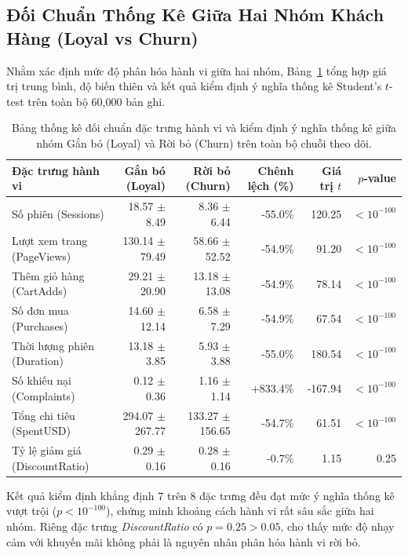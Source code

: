 \documentclass[12pt,a4paper]{report}
\begin{document}
\subsection{Đối Chuẩn Thống Kê Giữa Hai Nhóm Khách Hàng (Loyal vs Churn)}
Nhằm xác định mức độ phân hóa hành vi giữa hai nhóm, Bảng~\ref{tab:cust_stats} tổng hợp giá trị trung bình, độ biến thiên và kết quả kiểm định ý nghĩa thống kê Student's $t$-test trên toàn bộ 60,000 bản ghi.

\begin{table}[H]
\centering
\small
\caption{Bảng thống kê đối chuẩn đặc trưng hành vi và kiểm định ý nghĩa thống kê giữa nhóm Gắn bó (Loyal) và Rời bỏ (Churn) trên toàn bộ chuỗi theo dõi.}
\label{tab:cust_stats}
\begin{tabularx}{\textwidth}{lrrrrr}
\toprule
\textbf{Đặc trưng hành vi} & \textbf{Gắn bó (Loyal)} & \textbf{Rời bỏ (Churn)} & \textbf{Chênh lệch (\%)} & \textbf{Giá trị $t$} & \textbf{$p$-value} \\
\midrule
Số phiên (Sessions) & 18.57 $\pm$ 8.49 & 8.36 $\pm$ 6.44 & -55.0\% & 120.25 & $< 10^{-100}$ \\
Lượt xem trang (PageViews) & 130.14 $\pm$ 79.49 & 58.66 $\pm$ 52.52 & -54.9\% & 91.20 & $< 10^{-100}$ \\
Thêm giỏ hàng (CartAdds) & 29.21 $\pm$ 20.90 & 13.18 $\pm$ 13.08 & -54.9\% & 78.14 & $< 10^{-100}$ \\
Số đơn mua (Purchases) & 14.60 $\pm$ 12.14 & 6.58 $\pm$ 7.29 & -54.9\% & 67.54 & $< 10^{-100}$ \\
Thời lượng phiên (Duration) & 13.18 $\pm$ 3.85 & 5.93 $\pm$ 3.88 & -55.0\% & 180.54 & $< 10^{-100}$ \\
Số khiếu nại (Complaints) & 0.12 $\pm$ 0.36 & 1.16 $\pm$ 1.14 & +833.4\% & -167.94 & $< 10^{-100}$ \\
Tổng chi tiêu (SpentUSD) & 294.07 $\pm$ 267.77 & 133.27 $\pm$ 156.65 & -54.7\% & 61.51 & $< 10^{-100}$ \\
Tỷ lệ giảm giá (DiscountRatio) & 0.29 $\pm$ 0.16 & 0.28 $\pm$ 0.16 & -0.7\% & 1.15 & 0.25 \\
\bottomrule
\end{tabularx}
\end{table}

Kết quả kiểm định khẳng định 7 trên 8 đặc trưng đều đạt mức ý nghĩa thống kê vượt trội ($p < 10^{-100}$), chứng minh khoảng cách hành vi rất sâu sắc giữa hai nhóm. Riêng đặc trưng \textit{DiscountRatio} có $p = 0.25 > 0.05$, cho thấy mức độ nhạy cảm với khuyến mãi không phải là nguyên nhân phân hóa hành vi rời bỏ.
\end{document}
